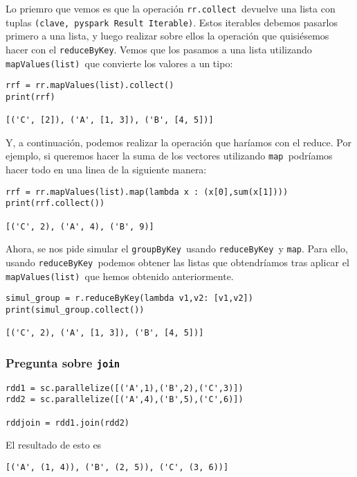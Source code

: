 \documentclass[11pt]{article}
\def\inline{\lstinline[basicstyle=\ttfamily,keywordstyle={}]}
\begin{document}
Lo priemro que vemos es que la operación \inline{rr.collect }devuelve una lista con tuplas  \inline{(clave, pyspark Result Iterable)}. Estos iterables debemos pasarlos primero a una lista, y luego realizar sobre ellos la operación que quisiésemos hacer con el  \inline{reduceByKey}. Vemos que los pasamos a una lista utilizando \inline{mapValues(list) }que convierte los valores a un tipo:

\begin{verbatim}
rrf = rr.mapValues(list).collect()
print(rrf)

[('C', [2]), ('A', [1, 3]), ('B', [4, 5])]
\end{verbatim}

Y, a continuación, podemos realizar la operación que haríamos con el reduce. Por ejemplo, si queremos hacer la suma de los vectores utilizando \inline{map }podríamos hacer todo en una linea de la siguiente manera:
\begin{verbatim}
rrf = rr.mapValues(list).map(lambda x : (x[0],sum(x[1])))
print(rrf.collect())

[('C', 2), ('A', 4), ('B', 9)]
\end{verbatim}

Ahora, se nos pide simular el \inline{groupByKey }usando \inline{reduceByKey }y  \inline{map}. Para ello, usando \inline{reduceByKey }podemos obtener las listas que obtendríamos tras aplicar el \inline{mapValues(list) }que hemos obtenido anteriormente.
\begin{verbatim}
simul_group = r.reduceByKey(lambda v1,v2: [v1,v2])
print(simul_group.collect())

[('C', 2), ('A', [1, 3]), ('B', [4, 5])]
\end{verbatim}

\subsubsection*{ Pregunta sobre  \inline{join}}

\begin{verbatim}
rdd1 = sc.parallelize([('A',1),('B',2),('C',3)])
rdd2 = sc.parallelize([('A',4),('B',5),('C',6)])

rddjoin = rdd1.join(rdd2)
\end{verbatim}

El resultado de esto es 
\begin{verbatim}
[('A', (1, 4)), ('B', (2, 5)), ('C', (3, 6))]
\end{verbatim}
\end{document}
